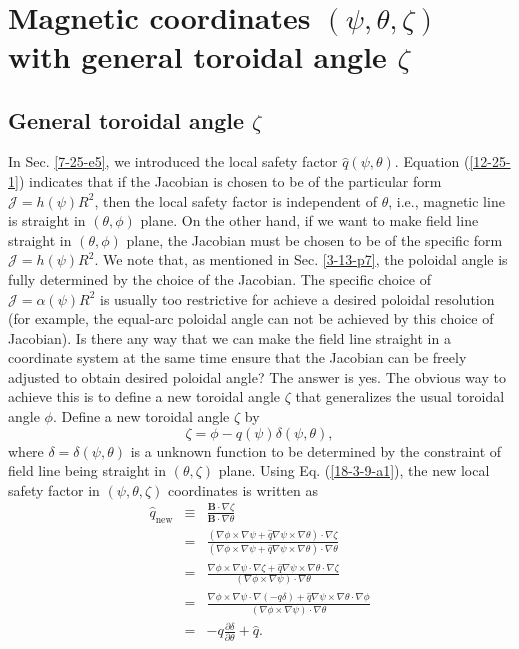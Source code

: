 \documentclass{llncs}
\newcommand{\tmop}[1]{\ensuremath{\operatorname{#1}}}
\begin{document}
\

\section{Magnetic coordinates $(\psi, \theta, \zeta)$ with general toroidal
angle $\zeta$}\label{23-12-27-1}

\subsection{General toroidal angle $\zeta$}\label{6-25-3}

In Sec. \ref{7-25-e5}, we introduced the local safety factor $\hat{q} (\psi,
\theta)$. Equation (\ref{12-25-1}) indicates that if the Jacobian is chosen to
be of the particular form $\mathcal{J}= h (\psi) R^2$, then the local safety
factor is independent of $\theta$, i.e., magnetic line is straight in
$(\theta, \phi)$ plane. On the other hand, if we want to make field line
straight in $(\theta, \phi)$ plane, the Jacobian must be chosen to be of the
specific form $\mathcal{J}= h (\psi) R^2$. We note that, as mentioned in Sec.
\ref{3-13-p7}, the poloidal angle is fully determined by the choice of the
Jacobian. The specific choice of $\mathcal{J}= \alpha (\psi) R^2$ is usually
too restrictive for achieve a desired poloidal resolution (for example, the
equal-arc poloidal angle can not be achieved by this choice of Jacobian). Is
there any way that we can make the field line straight in a coordinate system
at the same time ensure that the Jacobian can be freely adjusted to obtain
desired poloidal angle? The answer is yes. The obvious way to achieve this is
to define a new toroidal angle $\zeta$ that generalizes the usual toroidal
angle $\phi$. Define a new toroidal angle $\zeta$ by{\cite{cheng1987}}
\begin{equation}
  \label{5-13-e10} \zeta = \phi - q (\psi) \delta (\psi, \theta),
\end{equation}
where $\delta = \delta (\psi, \theta)$ is a unknown function to be determined
by the constraint of field line being straight in $(\theta, \zeta)$ plane.
Using Eq. (\ref{18-3-9-a1}), the new local safety factor in $(\psi, \theta,
\zeta)$ coordinates is written as
\begin{eqnarray}
  \hat{q}_{\tmop{new}} & \equiv & \frac{\mathbf{B} \cdot \nabla
  \zeta}{\mathbf{B} \cdot \nabla \theta} \nonumber\\
  & = & \frac{(\nabla \phi \times \nabla \psi + \hat{q} \nabla \psi \times
  \nabla \theta) \cdot \nabla \zeta}{(\nabla \phi \times \nabla \psi + \hat{q}
  \nabla \psi \times \nabla \theta) \cdot \nabla \theta} \nonumber\\
  & = & \frac{\nabla \phi \times \nabla \psi \cdot \nabla \zeta + \hat{q}
  \nabla \psi \times \nabla \theta \cdot \nabla \zeta}{(\nabla \phi \times
  \nabla \psi) \cdot \nabla \theta} \nonumber\\
  & = & \frac{\nabla \phi \times \nabla \psi \cdot \nabla (- q \delta) +
  \hat{q} \nabla \psi \times \nabla \theta \cdot \nabla \phi}{(\nabla \phi
  \times \nabla \psi) \cdot \nabla \theta} \nonumber\\
  & = & - q \frac{\partial \delta}{\partial \theta} + \hat{q} . 
  \label{6-24-5}
\end{eqnarray}
\end{document}

